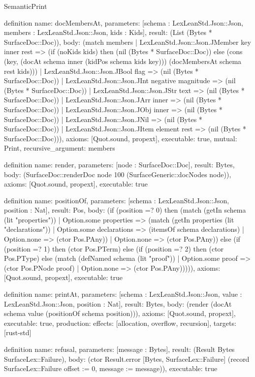 \begin{lexlean}{SemanticPrint}
\begin{semanticmodule}
definition{
  name: docMembersAt,
  parameters: [schema : LexLeanStd.Json::Json, members : LexLeanStd.Json::Json, kids : Kids],
  result: (List (Bytes * SurfaceDoc::Doc)),
  body: (match members
    | LexLeanStd.Json::Json.JMember key inner rest => (if (noKids kids) then (nil (Bytes * SurfaceDoc::Doc)) else (cons (key, (docAt schema inner (kidPos schema kids key))) (docMembersAt schema rest kids)))
    | LexLeanStd.Json::Json.JBool flag => (nil (Bytes * SurfaceDoc::Doc))
    | LexLeanStd.Json::Json.JInt negative magnitude => (nil (Bytes * SurfaceDoc::Doc))
    | LexLeanStd.Json::Json.JStr text => (nil (Bytes * SurfaceDoc::Doc))
    | LexLeanStd.Json::Json.JArr inner => (nil (Bytes * SurfaceDoc::Doc))
    | LexLeanStd.Json::Json.JObj inner => (nil (Bytes * SurfaceDoc::Doc))
    | LexLeanStd.Json::Json.JNil => (nil (Bytes * SurfaceDoc::Doc))
    | LexLeanStd.Json::Json.JItem element rest => (nil (Bytes * SurfaceDoc::Doc))),
  axioms: [Quot.sound, propext],
  executable: true,
  mutual: Print,
  recursive_argument: members
}

definition{
  name: render,
  parameters: [node : SurfaceDoc::Doc],
  result: Bytes,
  body: (SurfaceDoc::renderDoc node 100 (SurfaceGeneric::docNodes node)),
  axioms: [Quot.sound, propext],
  executable: true
}

definition{
  name: positionOf,
  parameters: [schema : LexLeanStd.Json::Json, position : Nat],
  result: Pos,
  body: (if (position =? 0) then (match (getIn schema (lit "properties"))
    | Option.some properties => (match (getIn properties (lit "declarations"))
      | Option.some declarations => (itemsOf schema declarations)
      | Option.none => (ctor Pos.PAny))
    | Option.none => (ctor Pos.PAny)) else (if (position =? 1) then (ctor Pos.PTerm) else (if (position =? 2) then (ctor Pos.PType) else (match (defNamed schema (lit "proof"))
    | Option.some proof => (ctor Pos.PNode proof)
    | Option.none => (ctor Pos.PAny))))),
  axioms: [Quot.sound, propext],
  executable: true
}

definition{
  name: printAt,
  parameters: [schema : LexLeanStd.Json::Json, value : LexLeanStd.Json::Json, position : Nat],
  result: Bytes,
  body: (render (docAt schema value (positionOf schema position))),
  axioms: [Quot.sound, propext],
  executable: true,
  production: {effects: [allocation, overflow, recursion], targets: [rust-std]}
}

definition{
  name: refusal,
  parameters: [message : Bytes],
  result: (Result Bytes SurfaceLex::Failure),
  body: (ctor Result.error [Bytes, SurfaceLex::Failure] (record SurfaceLex::Failure {offset := 0, message := message})),
  executable: true
}


\end{semanticmodule}
\end{lexlean}

